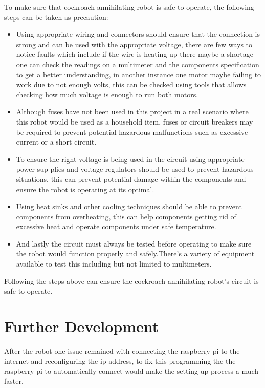 \documentclass[11pt]{article}
\begin{document}
	To make sure that cockroach annihilating robot is safe to operate, the following steps can be taken as precaution:
	\begin{itemize}
		\item 	Using appropriate wiring and connectors should ensure that the connection is strong and can be used with the appropriate voltage, there are few ways to notice faults which include if the wire is heating up there maybe a shortage one can check the readings on a multimeter and the components specification to get a better understanding, in another instance one motor maybe failing to work due to not enough volts, this can be checked using tools that allows checking how much voltage is enough to run both motors.
		\item 
		Although fuses have not been used in this project in a real scenario where this robot would be used as a household item, fuses or circuit breakers may be required to prevent potential hazardous malfunctions such as excessive current or a short circuit.
		\item To ensure the right voltage is being used in the circuit using appropriate power sup-plies and voltage regulators should be used to prevent hazardous situations, this can prevent potential damage within the components and ensure the robot is operating at its optimal.
		\item Using heat sinks and other cooling techniques should be able to prevent components from overheating, this can help components getting rid of excessive heat and operate components under safe temperature.
		\item And lastly the circuit must always be tested before operating to make sure the robot would function properly and safely.There's a variety of equipment available to test this including but not limited to multimeters.
		
		
		
	\end{itemize}


	
	
	Following the steps above can ensure the cockroach annihilating robot's circuit is safe to operate.
	
	
	
	
	\section{Further Development}
	
	After the robot one issue remained with connecting the raspberry pi to the internet and reconfiguring the ip address, to fix this programming the the raspberry pi to automatically connect would make the setting up process a much faster.
	
\end{document}
